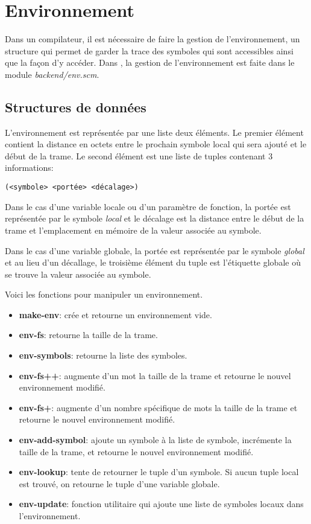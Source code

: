 \documentclass[11pt]{report}
\begin{document}
\chapter{Environnement}

Dans un compilateur, il est nécessaire de faire la gestion de
l'environnement, un structure qui permet de garder la trace des
symboles qui sont accessibles ainsi que la façon d'y accéder. Dans
\sins{}, la gestion de l'environnement est faite dans le module {\it
  backend/env.scm}.

\section{Structures de données}

L'environnement est représentée par une liste deux éléments. Le
premier élément contient la distance en octets entre le prochain
symbole local qui sera ajouté et le début de la trame. Le second
élément est une liste de tuples contenant 3 informations:


\begin{verbatim}
(<symbole> <portée> <décalage>)
\end{verbatim}

Dans le cas d'une variable locale ou d'un paramètre de fonction, la
portée est représentée par le symbole {\it local} et le décalage est la
distance entre le début de la trame et l'emplacement en mémoire de la
valeur associée au symbole.

Dans le cas d'une variable globale, la portée est représentée par le
symbole {\it global} et au lieu d'un décallage, le troisième élément
du tuple est l'étiquette globale où se trouve la valeur associée au
symbole.

Voici les fonctions pour manipuler un environnement.

\begin{itemize}
\item {\bf make-env}: crée et retourne un environnement vide.
\item {\bf env-fs}: retourne la taille de la trame.
\item {\bf env-symbols}: retourne la liste des symboles.
\item {\bf env-fs++}: augmente d'un mot la taille de la trame et
  retourne le nouvel environnement modifié.
\item {\bf env-fs+}: augmente d'un nombre spécifique de mots la taille
  de la trame et retourne le nouvel environnement modifié.
\item {\bf env-add-symbol}: ajoute un symbole à la liste de symbole,
  incrémente la taille de la trame, et retourne le nouvel
  environnement modifié.
\item {\bf env-lookup}: tente de retourner le tuple d'un symbole. Si
  aucun tuple local est trouvé, on retourne le tuple d'une variable
  globale.
\item {\bf env-update}: fonction utilitaire qui ajoute une liste de
  symboles locaux dans l'environnement.
\end{itemize}
\end{document}
